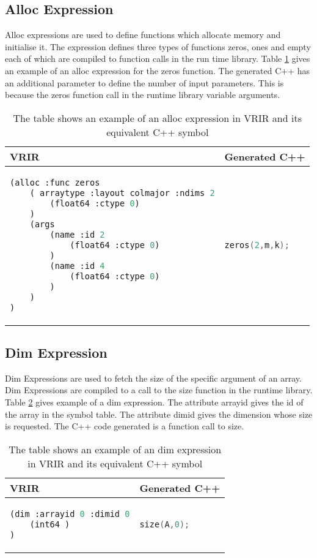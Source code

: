 \subsection{Alloc Expression}
Alloc expressions are used to define functions which allocate memory and initialise it. The expression defines three types of functions zeros, ones and empty each of which are compiled to function calls in the run time library. Table \ref{tab:allocExpr} gives an example of an alloc expression for the zeros function. The generated C++ has an additional parameter to define the number of input parameters. This is because the zeros function call in the runtime library variable arguments.
\begin{table}[htbp]
\centering
\begin{tabular}{|l|l|}
\hline

VRIR &  Generated C++ \\
\hline
{
\begin{lstlisting}[language=lisp,frame=none, numbers=none]
(alloc :func zeros
	( arraytype :layout colmajor :ndims 2
		(float64 :ctype 0)
	)
	(args
   		(name :id 2
   			(float64 :ctype 0)
		)
		(name :id 4
   			(float64 :ctype 0)
		)
	)
)
\end{lstlisting}
}
&
{
\begin{lstlisting}[language=c,frame=none, numbers=none]
zeros(2,m,k);
\end{lstlisting}
} \\
\hline
\end{tabular}
\caption[Alloc Expression example]{The table shows an example of an alloc expression in VRIR and its equivalent C++ symbol}
\label{tab:allocExpr}
\end{table}
\subsection{Dim Expression}
Dim Expressions are used to fetch the size of the specific argument of an array. Dim Expressions are compiled to a call to the size function in the runtime library. Table \ref{tab:dimExpr} gives example of a dim expression. The attribute \textsf{arrayid} gives the id of the array in the symbol table. The attribute \textsf{dimid} gives the dimension whose size is requested. The C++ code generated is a function call to \textsf{size}. 
\begin{table}[htbp]
\centering
\begin{tabular}{|l|l|}
\hline

VRIR &  Generated C++ \\
\hline
{
\begin{lstlisting}[language=lisp,frame=none, numbers=none]
(dim :arrayid 0 :dimid 0
	(int64 )
)
\end{lstlisting}
}
&
{
\begin{lstlisting}[language=c,frame=none, numbers=none]
size(A,0);
\end{lstlisting}
} \\
\hline
\end{tabular}
\caption[Dim Expression example]{The table shows an example of an dim expression in VRIR and its equivalent C++ symbol}
\label{tab:dimExpr}
\end{table}
